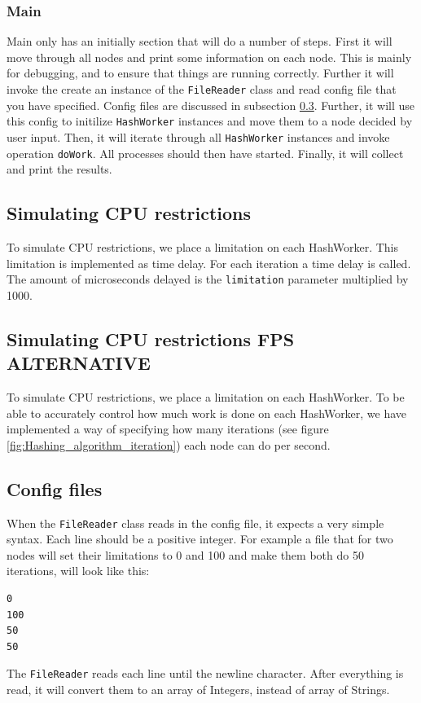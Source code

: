 \subsubsection{Main}
Main only has an initially section that will do a number of steps. First it will move through all nodes and print some information on each node. This is mainly for debugging, and to ensure that things are running correctly. Further it will invoke the create an instance of the \verb|FileReader| class and read config file that you have specified. Config files are discussed in subsection \ref{subsection:configfiles}. Further, it will use this config to initilize \verb|HashWorker| instances and move them to a node decided by user input. Then, it will iterate through all \verb|HashWorker| instances and invoke operation \verb|doWork|. All processes should then have started. Finally, it will collect and print the results.



\subsection{Simulating CPU restrictions}
To simulate CPU restrictions, we place a limitation on each HashWorker. This limitation is implemented as time delay. For each iteration a time delay is called. The amount of microseconds delayed is the \verb|limitation| parameter multiplied by 1000. 
\subsection{Simulating CPU restrictions FPS ALTERNATIVE}
To simulate CPU restrictions, we place a limitation on each HashWorker. To be able to accurately control how much work is done on each HashWorker, we have implemented a way of specifying how many iterations (see figure \ref{fig:Hashing_algorithm_iteration}) each node can do per second.



\subsection{Config files}\label{subsection:configfiles}
When the \verb|FileReader| class reads in the config file, it expects a very simple syntax. Each line should be a positive integer. For example a file that for two nodes will set their limitations to 0 and 100 and make them both do 50 iterations, will look like this:
\begin{lstlisting}
0
100
50
50
\end{lstlisting}
The \verb|FileReader| reads each line until the newline character. After everything is read, it will convert them to an array of Integers, instead of array of Strings.

